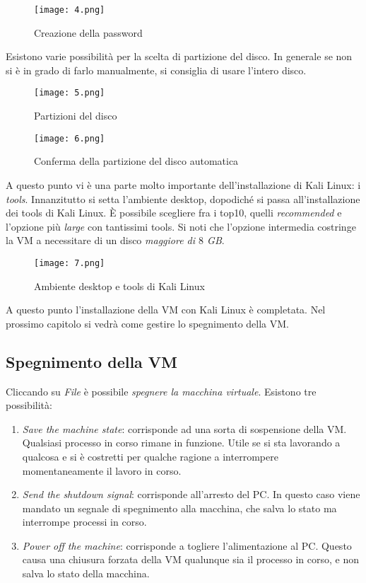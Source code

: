 \documentclass[14pt]{extreport}
\begin{document}
\begin{figure}[H]
    \centering
    \texttt{[image: 4.png]}
    \caption{Creazione della password}
    \label{Kalinsta4}
\end{figure}

Esistono varie possibilità per la scelta di partizione del disco. In generale se non si è in grado di farlo manualmente, si consiglia di usare l'intero disco.


\begin{figure}[H]
    \centering
    \texttt{[image: 5.png]}
    \caption{Partizioni del disco}
    \label{Kalinsta5}
\end{figure}

\begin{figure}[H]
    \centering
    \texttt{[image: 6.png]}
    \caption{Conferma della partizione del disco automatica}
    \label{Kalinsta6}
\end{figure}

A questo punto vi è una parte molto importante dell'installazione di Kali Linux: i \textit{tools}. Innanzitutto si setta l'ambiente desktop, dopodiché si passa all'installazione dei tools di Kali Linux. È possibile scegliere fra i top10, quelli \textit{recommended} e l'opzione più \textit{large} con tantissimi tools. Si noti che l'opzione intermedia costringe la VM a necessitare di un disco \textit{maggiore di $8$ GB}. 


\begin{figure}[H]
    \centering
    \texttt{[image: 7.png]}
    \caption{Ambiente desktop e tools di Kali Linux}
    \label{Kalinsta7}
\end{figure}

A questo punto l'installazione della VM con Kali Linux è completata. Nel prossimo capitolo si vedrà come gestire lo spegnimento della VM.

\subsection{Spegnimento della VM}
Cliccando su \textit{File} è possibile \textit{spegnere la macchina virtuale}. Esistono tre possibilità:

\begin{enumerate}
    \item \textit{Save the machine state}: corrisponde ad una sorta di sospensione della VM. Qualsiasi processo in corso rimane in funzione. Utile se si sta lavorando a qualcosa e si è costretti per qualche ragione a interrompere momentaneamente il lavoro in corso.
    \item \textit{Send the shutdown signal}: corrisponde all'arresto del PC. In questo caso viene mandato un segnale di spegnimento alla macchina, che salva lo stato ma interrompe processi in corso.
    \item \textit{Power off the machine}: corrisponde a togliere l'alimentazione al PC. Questo causa una chiusura forzata della VM qualunque sia il processo in corso, e non salva lo stato della macchina.
\end{enumerate}
\end{document}
